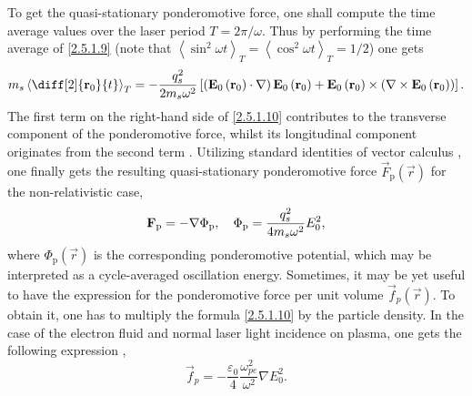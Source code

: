 To get the quasi-stationary ponderomotive force, one shall compute the time average values over the laser period $ T = 2 \pi/ \omega $. Thus by performing the time average of \ref{2.5.1.9} (note that $ \left\langle \sin^2 \omega t \right\rangle_T = \left\langle \cos^2 \omega t \right\rangle_T = 1/2$) one gets
\begin{equation}
\label{2.5.1.10}
m_s \left\langle \diff[2]{\vec{r}_0}{t} \right\rangle_{T} = - \frac{q_s^{2}}{2 m_s \omega^2} \left[\left(\vec{E}_0 \left(\vec{r}_0 \right) \cdot \nabla \right) \vec{E}_0 \left(\vec{r}_0 \right) + \vec{E}_0 \left(\vec{r}_0 \right) \times \left( \nabla \times \vec{E}_0 \left(\vec{r}_0 \right) \right)\right].
\end{equation}
The first term on the right-hand side of \ref{2.5.1.10} contributes to the transverse component of the ponderomotive force, whilst its longitudinal component originates from the second term \cite{eliezer}. Utilizing standard identities of vector calculus \cite{huba}, one finally gets the resulting quasi-stationary ponderomotive force $ \vec{F}_{\mathrm{p}} \left( \vec{r} \right) $ for the non-relativistic case,
\begin{equation}
\label{2.5.1.11}
\mathbf{F}_{\mathrm{p}} = - \nabla \Phi_{\mathrm{p}}, \quad \Phi_{\mathrm{p}} = \frac{q_s^{2}}{4 m_s \omega^2} E_0^{2},
\end{equation}
where $ \Phi_{\mathrm{p}} \left( \vec{r} \right) $ is the corresponding ponderomotive potential, which may be interpreted as a cycle-averaged oscillation energy. Sometimes, it may be yet useful to have the expression for the ponderomotive force per unit volume $ \vec{f}_{p} \left( \vec{r} \right) $. To obtain it, one has to multiply the formula \ref{2.5.1.10} by the particle density. In the case of the electron fluid and normal laser light incidence on plasma, one gets the following expression \cite{pfalzner},
\begin{equation}
\vec{f}_{p} = - \frac{\varepsilon_0}{4} \frac{\omega_{pe}^{2}}{\omega^{2}} \nabla E_0^{2}.
\end{equation}